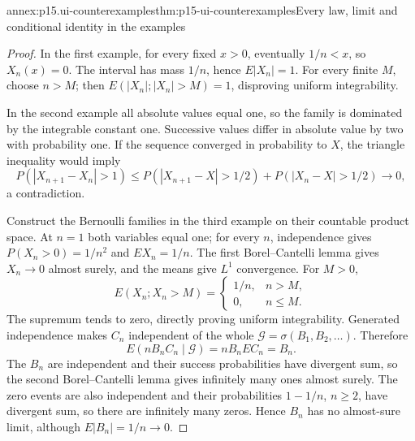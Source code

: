 \begin{annexitem}{annex:p15.ui-counterexamples}{thm:p15-ui-counterexamples}{Every law, limit and conditional identity in the examples}
\begin{proof}
In the first example, for every fixed \(x>0\), eventually \(1/n<x\),
so \(X_n(x)=0\). The interval has mass \(1/n\), hence \(E|X_n|=1\).
For every finite \(M\), choose \(n>M\); then
\(E(|X_n|;|X_n|>M)=1\), disproving uniform integrability.

In the second example all absolute values equal one, so the family
is dominated by the integrable constant one. Successive values differ
in absolute value by two with probability one. If the sequence
converged in probability to \(X\), the triangle inequality would imply
\[
 P(|X_{n+1}-X_n|>1)
 \leq P(|X_{n+1}-X|>1/2)+P(|X_n-X|>1/2)\longrightarrow0,
\]
a contradiction.

Construct the Bernoulli families in the third example on their countable
product space. At \(n=1\) both variables equal one; for every \(n\),
independence gives \(P(X_n>0)=1/n^2\) and \(EX_n=1/n\).
The first Borel--Cantelli lemma gives \(X_n\to0\) almost surely, and
the means give \(L^1\) convergence. For \(M>0\),
\[
 E(X_n;X_n>M)=
       \begin{cases}1/n,&n>M,\\0,&n\leq M.\end{cases}
\]
The supremum tends to zero, directly proving uniform integrability.
Generated independence makes \(C_n\) independent of the whole
\(\mathcal G=\sigma(B_1,B_2,\ldots)\). Therefore
\[
 E(nB_nC_n\mid\mathcal G)=nB_nEC_n=B_n.
\]
The \(B_n\) are independent and their success probabilities have divergent
sum, so the second Borel--Cantelli lemma gives infinitely many ones
almost surely. The zero events are also independent and their
probabilities \(1-1/n\), \(n\geq2\), have divergent sum, so there are
infinitely many zeros. Hence \(B_n\) has no almost-sure limit,
although \(E|B_n|=1/n\to0\).
\end{proof}
\end{annexitem}

